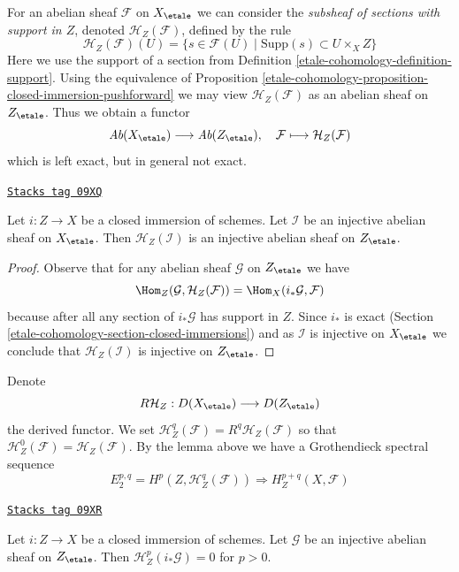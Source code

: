 \medskip\noindent
For an abelian sheaf $\mathcal{F}$ on $X_\etale$ we can consider
the {\it subsheaf of sections with support in $Z$}, denoted
$\mathcal{H}_Z(\mathcal{F})$, defined by the rule
$$
\mathcal{H}_Z(\mathcal{F})(U) =
\{s \in \mathcal{F}(U) \mid \text{Supp}(s) \subset U \times_X Z\}
$$
Here we use the support of a section from Definition \ref{etale-cohomology-definition-support}.
Using the equivalence of
Proposition \ref{etale-cohomology-proposition-closed-immersion-pushforward}
we may view $\mathcal{H}_Z(\mathcal{F})$ as an abelian sheaf on
$Z_\etale$. Thus we obtain a functor
$$
\textit{Ab}(X_\etale) \longrightarrow \textit{Ab}(Z_\etale),\quad
\mathcal{F} \longmapsto \mathcal{H}_Z(\mathcal{F})
$$
which is left exact, but in general not exact.

\begin{lemma}
\label{etale-cohomology-lemma-sections-with-support-acyclic}
\href{https://stacks.math.columbia.edu/tag/09XQ}{\texttt{Stacks tag 09XQ}}

Let $i : Z \to X$ be a closed immersion of schemes.
Let $\mathcal{I}$ be an injective abelian sheaf on $X_\etale$.
Then $\mathcal{H}_Z(\mathcal{I})$ is an injective abelian sheaf
on $Z_\etale$.
\end{lemma}

\begin{proof}
Observe that for any abelian sheaf $\mathcal{G}$ on $Z_\etale$
we have
$$
\Hom_Z(\mathcal{G}, \mathcal{H}_Z(\mathcal{F})) =
\Hom_X(i_*\mathcal{G}, \mathcal{F})
$$
because after all any section of $i_*\mathcal{G}$ has support in $Z$.
Since $i_*$ is exact (Section \ref{etale-cohomology-section-closed-immersions}) and as
$\mathcal{I}$ is injective on $X_\etale$ we conclude that
$\mathcal{H}_Z(\mathcal{I})$ is injective on $Z_\etale$.
\end{proof}

Denote
$$
R\mathcal{H}_Z : D(X_\etale) \longrightarrow D(Z_\etale)
$$
the derived functor. We set
$\mathcal{H}^q_Z(\mathcal{F}) = R^q\mathcal{H}_Z(\mathcal{F})$ so that
$\mathcal{H}^0_Z(\mathcal{F}) = \mathcal{H}_Z(\mathcal{F})$.
By the lemma above we have a Grothendieck spectral sequence
$$
E_2^{p, q} = H^p(Z, \mathcal{H}^q_Z(\mathcal{F}))
\Rightarrow H^{p + q}_Z(X, \mathcal{F})
$$

\begin{lemma}
\label{etale-cohomology-lemma-cohomology-with-support-sheaf-on-support}
\href{https://stacks.math.columbia.edu/tag/09XR}{\texttt{Stacks tag 09XR}}

Let $i : Z \to X$ be a closed immersion of schemes.
Let $\mathcal{G}$ be an injective abelian sheaf on $Z_\etale$.
Then $\mathcal{H}^p_Z(i_*\mathcal{G}) = 0$ for $p > 0$.
\end{lemma}

